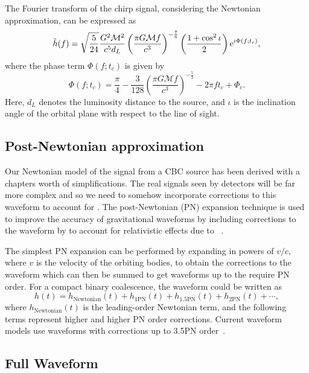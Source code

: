 The Fourier transform of the chirp signal, considering the Newtonian approximation, can be expressed as
%
\begin{equation}
    \Tilde{h}(f) = \sqrt{\frac{5}{24}} \frac{G^2 \mathcal{M}^2}{c^5 d_L} \left(\frac{\pi G \mathcal{M} f}{c^3}\right)^{-\frac{7}{6}} \left(\frac{1 + \cos^2 \iota}{2}\right) {\rm e}^{i \Phi(f; t_c)},
\end{equation}
%
where the phase term \( \Phi(f; t_c) \) is given by
%
\begin{equation}
    \Phi(f; t_c) = \frac{\pi}{4} - \frac{3}{128} \left(\frac{\pi G \mathcal{M} f}{c^3}\right)^{-\frac{5}{3}} - 2\pi f t_c + \Phi_c.
\end{equation}
%
Here, \( d_L \) denotes the luminosity distance to the source, and \( \iota \) is the inclination angle of the orbital plane with respect to the line of sight.

\subsection{\label{1:sec:post_newtonian_treatment}Post-Newtonian approximation}

Our Newtonian model of the \gwadj signal from a CBC source has been derived with a chapters worth of simplifications. The real signals seen by \gwadj detectors will be far more complex and so we need to somehow incorporate corrections to this waveform to account for \GR. The post-Newtonian (PN) expansion technique is used to improve the accuracy of gravitational waveforms by including corrections to the waveform by to account for relativistic effects due to \GR~\cite{2PN_1:1996, 2PN_2:1996, 2PN_3:1995}.

The simplest PN expansion can be performed by expanding in powers of \( v/c \), where \( v \) is the velocity of the orbiting bodies, to obtain the corrections to the waveform which can then be summed to get waveforms up to the require PN order. For a compact binary coalescence, the waveform could be written as
%
\begin{equation}
    h(t) = h_{\text{Newtonian}}(t) + h_{\text{1PN}}(t) + h_{\text{1.5PN}}(t) + h_{\text{2PN}}(t) + \cdots,
\end{equation}
%
where \( h_{\text{Newtonian}}(t) \) is the leading-order Newtonian term, and the following terms represent higher and higher PN order corrections. Current waveform models use waveforms with corrections up to 3.5PN order~\cite{PN_models:2009}.

\subsection{\label{1:sec:full_waveform}Full Waveform}

